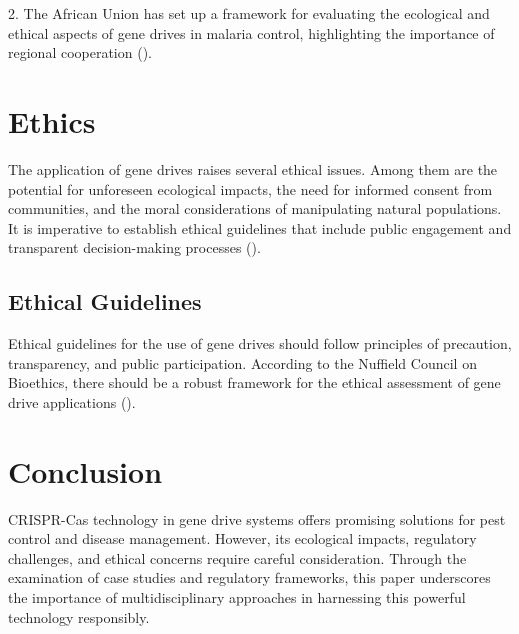 \documentclass[12pt]{article}
\begin{document}
2. The African Union has set up a framework for evaluating the ecological and ethical aspects of gene drives in malaria control, highlighting the importance of regional cooperation (\citealp{AU2018}).

\section{Ethics}
The application of gene drives raises several ethical issues. Among them are the potential for unforeseen ecological impacts, the need for informed consent from communities, and the moral considerations of manipulating natural populations. It is imperative to establish ethical guidelines that include public engagement and transparent decision-making processes (\citealp{Resnik2017}).

\subsection{Ethical Guidelines}
Ethical guidelines for the use of gene drives should follow principles of precaution, transparency, and public participation. According to the Nuffield Council on Bioethics, there should be a robust framework for the ethical assessment of gene drive applications (\citealp{Nuffield2018}).

\section{Conclusion}
CRISPR-Cas technology in gene drive systems offers promising solutions for pest control and disease management. However, its ecological impacts, regulatory challenges, and ethical concerns require careful consideration. Through the examination of case studies and regulatory frameworks, this paper underscores the importance of multidisciplinary approaches in harnessing this powerful technology responsibly.
\end{document}
